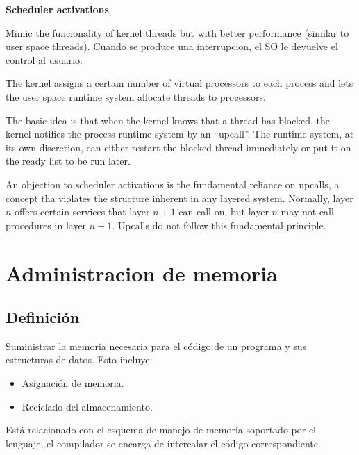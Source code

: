 \documentclass[a4paper, twoside]{article}
\begin{document}
\textbf{Scheduler activations}

Mimic the funcionality of kernel threads but with better performance
(similar to user space threads).
Cuando se produce una interrupcion, el SO le devuelve el control al usuario.

The kernel assigns a certain number of virtual processors to each process and
lets the user space runtime system allocate threads to processors.

The basic idea is that when the kernel knows that a thread has blocked,
the kernel notifies the process runtime system by an ``upcall''.
The runtime system, at its own discretion, can either restart the blocked
thread immediately or put it on the ready list to be run later.

An objection to scheduler activations is the fundamental reliance on upcalls,
a concept tha violates the structure inherent in any layered system.
Normally, layer $n$ offers certain services that layer $ n + 1 $ can call on,
but layer $n$ may not call procedures in layer $ n + 1 $.
Upcalls do not follow this fundamental principle.

\newpage
\section{Administracion de memoria}

\subsection{Definición}

Suministrar la memoria necesaria para el código de un programa y sus
estructuras de datos.
Esto incluye:
\begin{itemize}
  \item Asignación de memoria.
  \item Reciclado del almacenamiento.
\end{itemize}

Está relacionado con el esquema de manejo de memoria soportado por el lenguaje,
el compilador se encarga de intercalar el código correspondiente.
\end{document}
